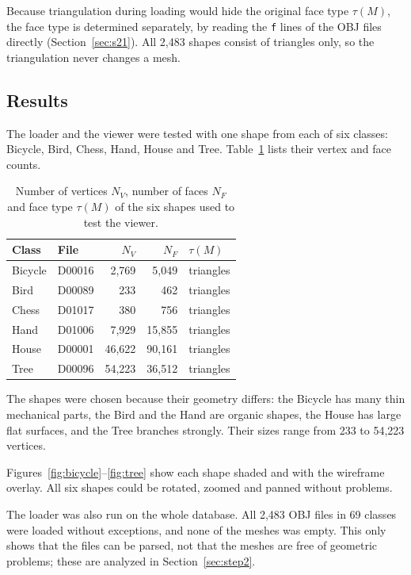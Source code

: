 \documentclass[10pt,a4paper]{article}
\begin{document}
Because triangulation during loading would hide the original face type $\tau(M)$, the face type is determined separately, by
reading the \texttt{f} lines of the OBJ files directly (Section~\ref{sec:s21}). All 2,483 shapes consist of triangles only,
so the triangulation never changes a mesh.

\subsection{Results}\label{sec:results1}
The loader and the viewer were tested with one shape from each of six classes: Bicycle, Bird, Chess, Hand, House and Tree.
Table~\ref{tab:six} lists their vertex and face counts.

\begin{table}[htbp]\centering\small
\begin{tabular}{@{}llrrl@{}}
\toprule
Class & File & $N_V$ & $N_F$ & $\tau(M)$ \\
\midrule
Bicycle & D00016 & 2,769 & 5,049 & triangles \\
Bird & D00089 & 233 & 462 & triangles \\
Chess & D01017 & 380 & 756 & triangles \\
Hand & D01006 & 7,929 & 15,855 & triangles \\
House & D00001 & 46,622 & 90,161 & triangles \\
Tree & D00096 & 54,223 & 36,512 & triangles \\
\bottomrule
\end{tabular}
\caption{Number of vertices $N_V$, number of faces $N_F$ and face type $\tau(M)$ of the six shapes used to test the viewer.}
\label{tab:six}
\end{table}

The shapes were chosen because their geometry differs: the Bicycle has many thin mechanical parts, the Bird and the Hand are
organic shapes, the House has large flat surfaces, and the Tree branches strongly. Their sizes range from 233 to 54,223 vertices.

Figures~\ref{fig:bicycle}--\ref{fig:tree} show each shape shaded and with the wireframe overlay. All six shapes could be
rotated, zoomed and panned without problems.

The loader was also run on the whole database. All 2,483 OBJ files in 69 classes were loaded without exceptions, and none of
the meshes was empty. This only shows that the files can be parsed, not that the meshes are free of geometric problems; these
are analyzed in Section~\ref{sec:step2}.
\end{document}
